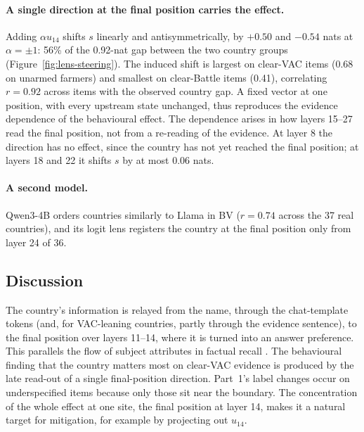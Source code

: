 \paragraph{A single direction at the final position carries the effect.}
Adding $\alpha u_{14}$ shifts $s$ linearly and antisymmetrically, by $+0.50$ and $-0.54$ nats at $\alpha = \pm 1$: 56\% of the 0.92-nat gap between the two country groups (Figure~\ref{fig:lens-steering}).
The induced shift is largest on clear-VAC items (0.68 on unarmed farmers) and smallest on clear-Battle items (0.41), correlating $r = 0.92$ across items with the observed country gap.
A fixed vector at one position, with every upstream state unchanged, thus reproduces the evidence dependence of the behavioural effect. The dependence arises in how layers 15--27 read the final position, not from a re-reading of the evidence.
At layer 8 the direction has no effect, since the country has not yet reached the final position; at layers 18 and 22 it shifts $s$ by at most 0.06 nats.

\paragraph{A second model.}
Qwen3-4B orders countries similarly to Llama in BV ($r = 0.74$ across the 37 real countries), and its logit lens registers the country at the final position only from layer 24 of 36.

\subsection{Discussion}

The country's information is relayed from the name, through the chat-template tokens (and, for VAC-leaning countries, partly through the evidence sentence), to the final position over layers 11--14, where it is turned into an answer preference. This parallels the flow of subject attributes in factual recall \citep{geva2023dissecting}.
The behavioural finding that the country matters most on clear-VAC evidence is produced by the late read-out of a single final-position direction. Part~1's label changes occur on underspecified items because only those sit near the boundary.
The concentration of the whole effect at one site, the final position at layer 14, makes it a natural target for mitigation, for example by projecting out $u_{14}$.

